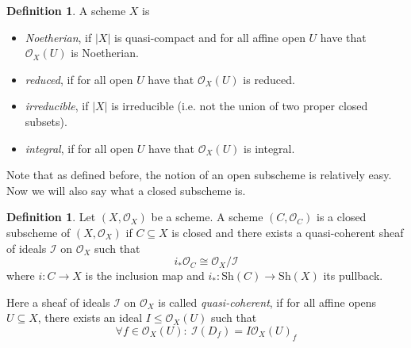 \documentclass{scrartcl}
\renewcommand{\O}{\mathcal{O}}
\theoremstyle{definition}
\newtheorem{definition}[prop]{Definition}
\begin{document}
\begin{definition}
    A scheme $X$ is
    \begin{itemize}
        \item \emph{Noetherian}, if $|X|$ is quasi-compact and for all affine open $U$ have that $\O_X(U)$ is Noetherian.
        \item \emph{reduced}, if for all open $U$ have that $\O_X(U)$ is reduced.
        \item \emph{irreducible}, if $|X|$ is irreducible (i.e. not the union of two proper closed subsets).
        \item \emph{integral}, if for all open $U$ have that $\O_X(U)$ is integral.
    \end{itemize}
\end{definition}

Note that as defined before, the notion of an open subscheme is relatively easy.
Now we will also say what a closed subscheme is.

\begin{definition}
    Let $(X, \O_X)$ be a scheme.
    A scheme $(C, \O_C)$ is a closed subscheme of $(X, \O_X)$ if $C \subseteq X$ is closed and there exists a quasi-coherent sheaf of ideals $\mathcal{I}$ on $\O_X$ such that
    \begin{equation*}
        i_*\O_C \cong \O_X/\mathcal{I}
    \end{equation*}
    where $i: C \to X$ is the inclusion map and $i_*: \mathrm{Sh}(C) \to \mathrm{Sh}(X)$ its pullback.

    Here a sheaf of ideals $\mathcal{I}$ on $\O_X$ is called \emph{quasi-coherent}, if for all affine opens $U \subseteq X$, there exists an ideal $I \leq \O_X(U)$ such that
    \begin{equation*}
        \forall f \in \O_X(U): \ \mathcal{I}(D_f) = I \mathcal{O}_X(U)_f
    \end{equation*}
\end{definition}
\end{document}
